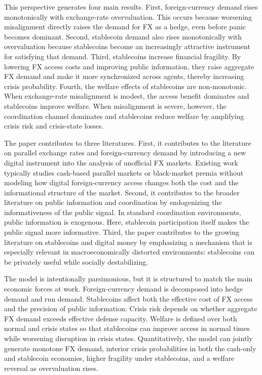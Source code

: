 \documentclass[12pt]{article}
\begin{document}
This perspective generates four main results. First, foreign-currency demand rises monotonically with exchange-rate overvaluation. This occurs because worsening misalignment directly raises the demand for FX as a hedge, even before panic becomes dominant. Second, stablecoin demand also rises monotonically with overvaluation because stablecoins become an increasingly attractive instrument for satisfying that demand. Third, stablecoins increase financial fragility. By lowering FX access costs and improving public information, they raise aggregate FX demand and make it more synchronized across agents, thereby increasing crisis probability. Fourth, the welfare effects of stablecoins are non-monotonic. When exchange-rate misalignment is modest, the access benefit dominates and stablecoins improve welfare. When misalignment is severe, however, the coordination channel dominates and stablecoins reduce welfare by amplifying crisis risk and crisis-state losses.

The paper contributes to three literatures. First, it contributes to the literature on parallel exchange rates and foreign-currency demand by introducing a new digital instrument into the analysis of unofficial FX markets. Existing work typically studies cash-based parallel markets or black-market premia without modeling how digital foreign-currency access changes both the cost and the informational structure of the market. Second, it contributes to the broader literature on public information and coordination by endogenizing the informativeness of the public signal. In standard coordination environments, public information is exogenous. Here, stablecoin participation itself makes the public signal more informative. Third, the paper contributes to the growing literature on stablecoins and digital money by emphasizing a mechanism that is especially relevant in macroeconomically distorted environments: stablecoins can be privately useful while socially destabilizing.

The model is intentionally parsimonious, but it is structured to match the main economic forces at work. Foreign-currency demand is decomposed into hedge demand and run demand. Stablecoins affect both the effective cost of FX access and the precision of public information. Crisis risk depends on whether aggregate FX demand exceeds effective defense capacity. Welfare is defined over both normal and crisis states so that stablecoins can improve access in normal times while worsening disruption in crisis states. Quantitatively, the model can jointly generate monotone FX demand, interior crisis probabilities in both the cash-only and stablecoin economies, higher fragility under stablecoins, and a welfare reversal as overvaluation rises.
\end{document}
